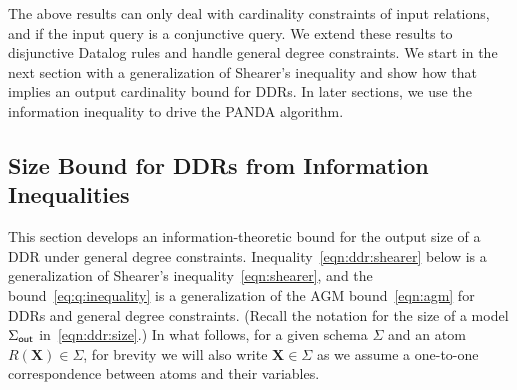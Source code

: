 \documentclass{theoretics}
\newcommand{\out}{\text{\sf out}}
\newcommand{\panda}{\textsf{PANDA}\xspace}
\begin{document}
The above results can only deal with cardinality constraints of input relations, and if the
input query is a conjunctive query. We extend these results to disjunctive Datalog rules and
handle general degree constraints. We start in the next section with a generalization of
Shearer's inequality and show how that implies an output cardinality bound for DDRs. In
later sections, we use the information inequality to drive the \panda algorithm.

\subsection{Size Bound for DDRs from Information Inequalities}
\label{subsec:upperbound}

This section develops an information-theoretic bound for the output size of a DDR under
general degree constraints. Inequality~\eqref{eqn:ddr:shearer} below is a generalization of
Shearer's inequality~\eqref{eqn:shearer}, and the bound~\eqref{eq:q:inequality} is a
generalization of the AGM bound~\eqref{eqn:agm} for DDRs and general degree constraints. (Recall
the notation for the size of a model $\Sigma_{\out}$ in~\eqref{eqn:ddr:size}.) In what
follows, for a given schema $\Sigma$ and an atom $R(\bm X) \in \Sigma$, for brevity we will
also write $\bm X \in \Sigma$ as we assume a one-to-one correspondence between atoms and
their variables.
\end{document}

